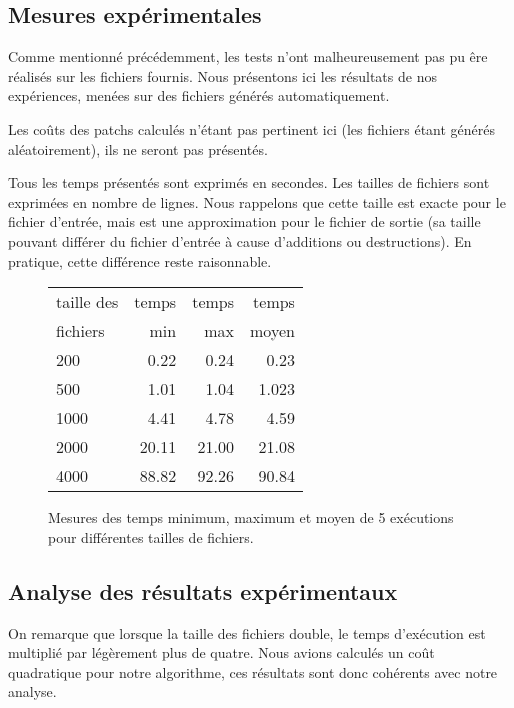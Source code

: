\documentclass[a4paper, 10pt, french]{article}
\begin{document}
  \subsection{Mesures expérimentales}
    Comme mentionné précédemment, les tests n'ont malheureusement pas pu êre réalisés
    sur les fichiers fournis.
    Nous présentons ici les résultats de nos expériences, menées sur des fichiers
    générés automatiquement.

    Les coûts des patchs calculés n'étant pas pertinent ici (les fichiers étant
    générés aléatoirement), ils ne seront pas présentés.

    Tous les temps présentés sont exprimés en secondes. Les tailles de fichiers
    sont exprimées en nombre de lignes. Nous rappelons que cette taille est exacte
    pour le fichier d'entrée, mais est une approximation pour le fichier de sortie
    (sa taille pouvant différer du fichier d'entrée à cause d'additions ou destructions).
    En pratique, cette différence reste raisonnable.

    \begin{figure}[h]
      \begin{center}
        \begin{tabular}{|l||r|r|r||}
          \hline
          \hline
            taille des &   temps     & temps   & temps \\
            fichiers &   min       & max     & moyen \\
          \hline
          \hline
            200 &  0.22      &   0.24  &  0.23   \\
          \hline
            500 &  1.01      &   1.04  &  1.023   \\
          \hline
            1000 &   4.41     &  4.78   &  4.59   \\
          \hline
            2000 & 20.11   &  21.00   &  21.08   \\
          \hline
            4000 & 88.82  &    92.26   &  90.84  \\
          \hline
          \hline
        \end{tabular}
        \caption{Mesures des temps minimum, maximum et moyen de 5 exécutions pour différentes tailles de fichiers.}
        \label{table-temps}
      \end{center}
    \end{figure}

\subsection{Analyse des résultats expérimentaux}
On remarque que lorsque la taille des fichiers double, le temps d'exécution est
multiplié par légèrement plus de quatre. Nous avions calculés un coût quadratique
pour notre algorithme, ces résultats sont donc cohérents avec notre analyse.
\end{document}
